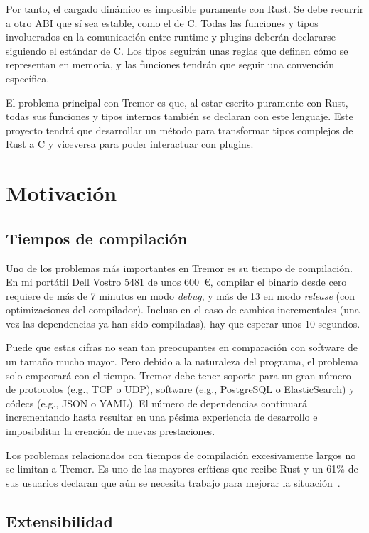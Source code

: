 Por tanto, el cargado dinámico es imposible puramente con Rust. Se debe recurrir
a otro ABI que sí sea estable, como el de C. Todas las funciones y tipos
involucrados en la comunicación entre runtime y plugins deberán declararse
siguiendo el estándar de C. Los tipos seguirán unas reglas que definen cómo se
representan en memoria, y las funciones tendrán que seguir una convención
específica.

El problema principal con Tremor es que, al estar escrito puramente con Rust,
todas sus funciones y tipos internos también se declaran con este lenguaje. Este
proyecto tendrá que desarrollar un método para transformar tipos complejos de
Rust a C y viceversa para poder interactuar con plugins.

\section{Motivación}

\subsection{Tiempos de compilación}

Uno de los problemas más importantes en Tremor es su tiempo de compilación. En
mi portátil Dell Vostro 5481 de unos 600~€, compilar el binario 
desde cero requiere de más de 7 minutos en modo \emph{debug}, y más de 13 en
modo \emph{release} (con optimizaciones del compilador). Incluso en el caso de
cambios incrementales (una vez las dependencias ya han sido compiladas), hay que
esperar unos 10 segundos.

Puede que estas cifras no sean tan preocupantes en comparación con software de
un tamaño mucho mayor. Pero debido a la naturaleza del programa, el problema
solo empeorará con el tiempo. Tremor debe tener soporte para un gran número de
protocolos (e.g., TCP o UDP), software (e.g., PostgreSQL o ElasticSearch) y
códecs (e.g., JSON o YAML). El número de dependencias continuará incrementando
hasta resultar en una pésima experiencia de desarrollo e imposibilitar la
creación de nuevas prestaciones.

Los problemas relacionados con tiempos de compilación excesivamente largos no se
limitan a Tremor. Es uno de las mayores críticas que recibe Rust y un 61\% de
sus usuarios declaran que aún se necesita trabajo para mejorar la
situación~\cite{rustsurvey}.

\subsection{Extensibilidad}

